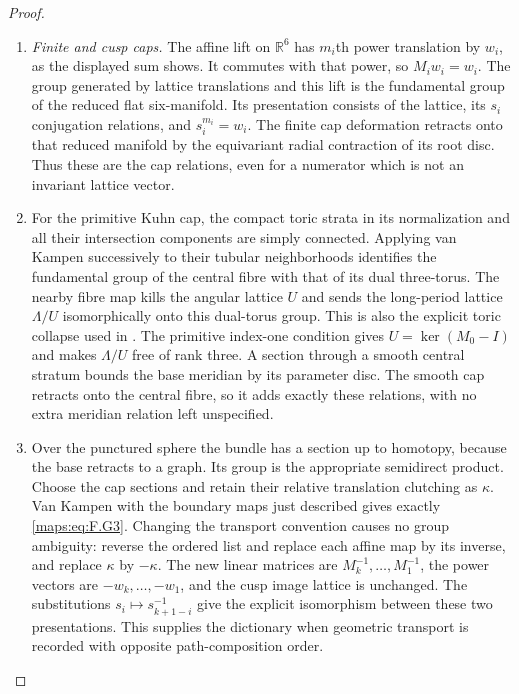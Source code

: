 \begin{proof}
\begin{enumerate}[label={$\langle1\rangle$\arabic*.}]
\item \emph{Finite and cusp caps.}
The affine lift on $\mathbb R^6$ has $m_i$th power translation by
$w_i$, as the displayed sum shows.  It commutes with that power,
so $M_iw_i=w_i$.  The group generated by lattice translations
and this lift is the fundamental group of the reduced flat
six-manifold.  Its presentation consists of the lattice, its
$s_i$ conjugation relations, and $s_i^{m_i}=w_i$.
The finite cap deformation retracts onto that reduced manifold
by the equivariant radial contraction of its root disc.
Thus these are the cap relations, even for a numerator
which is not an invariant lattice vector.

\item For the primitive Kuhn cap, the compact toric strata in its
normalization and all their intersection components are simply
connected.  Applying van Kampen successively to their tubular
neighborhoods identifies the fundamental group of the central
fibre with that of its dual three-torus.  The nearby fibre map
kills the angular lattice $U$ and sends the long-period lattice
$\Lambda/U$ isomorphically onto this dual-torus group.  This is
also the explicit toric collapse used in .  The primitive
index-one condition gives $U=\ker(M_0-I)$ and makes $\Lambda/U$
free of rank three.  A section through a smooth central stratum
bounds the base meridian by its parameter disc.  The smooth cap
retracts onto the central fibre, so it adds exactly these
relations, with no extra meridian relation left unspecified.

\item Over the punctured sphere the bundle has a section up to homotopy,
because the base retracts to a graph.  Its group is the appropriate
semidirect product.  Choose the cap sections and retain their
relative translation clutching as $\kappa$.  Van Kampen with the
boundary maps just described gives exactly \eqref{maps:eq:F.G3}.
Changing the transport convention causes no group ambiguity:
reverse the ordered list and replace each affine map by its
inverse, and replace $\kappa$ by $-\kappa$.  The new linear
matrices are $M_k^{-1},\ldots,M_1^{-1}$, the power vectors are
$-w_k,\ldots,-w_1$, and the cusp image lattice is unchanged.
The substitutions $s_i\mapsto s_{k+1-i}^{-1}$ give the explicit
isomorphism between these two presentations.  This supplies the
dictionary when geometric transport is recorded with opposite
path-composition order.


\end{enumerate}
\end{proof}
